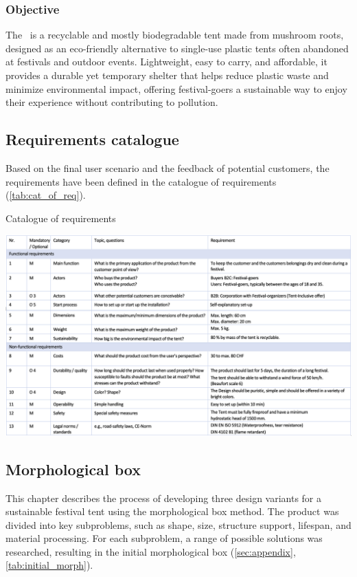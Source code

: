 \documentclass{article}
\begin{document}
\subsubsection{Objective}
The \myc\ is a recyclable and mostly biodegradable tent made from mushroom roots,
designed as an eco-friendly alternative to single-use plastic tents often abandoned at
festivals and outdoor events. Lightweight, easy to carry, and affordable, it provides a
durable yet temporary shelter that helps reduce plastic waste and minimize
environmental impact, offering festival-goers a sustainable way to enjoy their experience
without contributing to pollution.

\subsection{Requirements catalogue}
Based on the final user scenario and the feedback of potential customers, the
requirements have been defined in the catalogue of requirements (\autoref{tab:cat_of_req}).

\begin{table}[ht!]
    \centering
    \caption{Catalogue of requirements}
    \includegraphics[width=\textwidth]{media/req_cat_high_res.png}
    \label{tab:cat_of_req}
\end{table}

\subsection{Morphological box}
This chapter describes the process of developing three design variants for a sustainable
festival tent using the morphological box method. The product was divided into key
subproblems, such as shape, size, structure support, lifespan, and material processing.
For each subproblem, a range of possible solutions was researched, resulting in the
initial morphological box (\autoref{sec:appendix}, \autoref{tab:initial_morph}).
\end{document}
